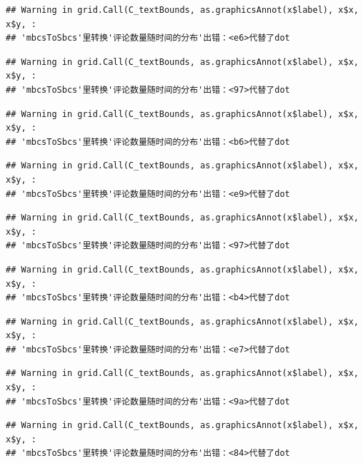 \documentclass[
]{article}
\begin{document}
\begin{verbatim}
## Warning in grid.Call(C_textBounds, as.graphicsAnnot(x$label), x$x, x$y, :
## 'mbcsToSbcs'里转换'评论数量随时间的分布'出错：<e6>代替了dot
\end{verbatim}

\begin{verbatim}
## Warning in grid.Call(C_textBounds, as.graphicsAnnot(x$label), x$x, x$y, :
## 'mbcsToSbcs'里转换'评论数量随时间的分布'出错：<97>代替了dot
\end{verbatim}

\begin{verbatim}
## Warning in grid.Call(C_textBounds, as.graphicsAnnot(x$label), x$x, x$y, :
## 'mbcsToSbcs'里转换'评论数量随时间的分布'出错：<b6>代替了dot
\end{verbatim}

\begin{verbatim}
## Warning in grid.Call(C_textBounds, as.graphicsAnnot(x$label), x$x, x$y, :
## 'mbcsToSbcs'里转换'评论数量随时间的分布'出错：<e9>代替了dot
\end{verbatim}

\begin{verbatim}
## Warning in grid.Call(C_textBounds, as.graphicsAnnot(x$label), x$x, x$y, :
## 'mbcsToSbcs'里转换'评论数量随时间的分布'出错：<97>代替了dot
\end{verbatim}

\begin{verbatim}
## Warning in grid.Call(C_textBounds, as.graphicsAnnot(x$label), x$x, x$y, :
## 'mbcsToSbcs'里转换'评论数量随时间的分布'出错：<b4>代替了dot
\end{verbatim}

\begin{verbatim}
## Warning in grid.Call(C_textBounds, as.graphicsAnnot(x$label), x$x, x$y, :
## 'mbcsToSbcs'里转换'评论数量随时间的分布'出错：<e7>代替了dot
\end{verbatim}

\begin{verbatim}
## Warning in grid.Call(C_textBounds, as.graphicsAnnot(x$label), x$x, x$y, :
## 'mbcsToSbcs'里转换'评论数量随时间的分布'出错：<9a>代替了dot
\end{verbatim}

\begin{verbatim}
## Warning in grid.Call(C_textBounds, as.graphicsAnnot(x$label), x$x, x$y, :
## 'mbcsToSbcs'里转换'评论数量随时间的分布'出错：<84>代替了dot
\end{verbatim}
\end{document}
